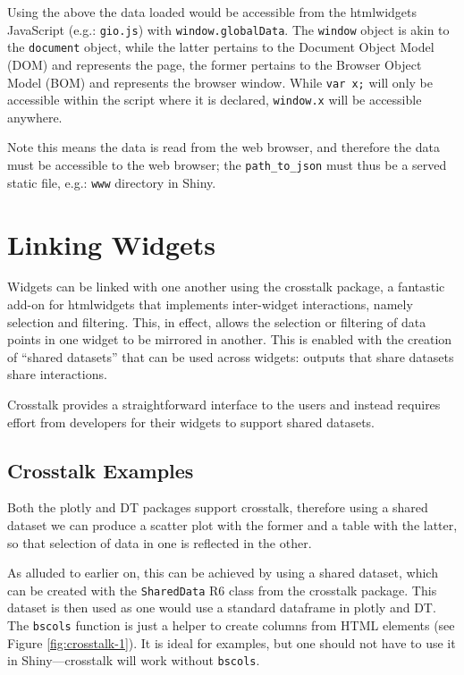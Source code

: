 \documentclass[10pt,]{krantz}
\begin{document}
Using the above the data loaded would be accessible from the htmlwidgets JavaScript (e.g.: \texttt{gio.js}) with \texttt{window.globalData}. The \texttt{window} object is akin to the \texttt{document} object, while the latter pertains to the Document Object Model (DOM) and represents the page, the former pertains to the Browser Object Model (BOM) and represents the browser window. While \texttt{var\ x;} will only be accessible within the script where it is declared, \texttt{window.x} will be accessible anywhere.

Note this means the data is read from the web browser, and therefore the data must be accessible to the web browser; the \texttt{path\_to\_json} must thus be a served static file, e.g.: \texttt{www} directory in Shiny.

\hypertarget{linking-widgets}{%
\chapter{Linking Widgets}\label{linking-widgets}}

Widgets can be linked with one another using the crosstalk \citep{R-crosstalk} package, a fantastic add-on for htmlwidgets that implements inter-widget interactions, namely selection and filtering. This, in effect, allows the selection or filtering of data points in one widget to be mirrored in another. This is enabled with the creation of ``shared datasets'' that can be used across widgets: outputs that share datasets share interactions.

Crosstalk provides a straightforward interface to the users and instead requires effort from developers for their widgets to support shared datasets.

\hypertarget{linking-widgets-examples}{%
\section{Crosstalk Examples}\label{linking-widgets-examples}}

Both the plotly and DT packages support crosstalk, therefore using a shared dataset we can produce a scatter plot with the former and a table with the latter, so that selection of data in one is reflected in the other.

As alluded to earlier on, this can be achieved by using a shared dataset, which can be created with the \texttt{SharedData} R6 class from the crosstalk package. This dataset is then used as one would use a standard dataframe in plotly and DT. The \texttt{bscols} function is just a helper to create columns from HTML elements (see Figure \ref{fig:crosstalk-1}). It is ideal for examples, but one should not have to use it in Shiny---crosstalk will work without \texttt{bscols}.
\end{document}
